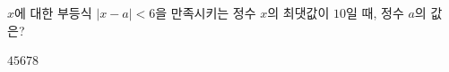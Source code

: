 $x$에 대한 부등식 $|x-a|<6$을 만족시키는 정수 $x$의 최댓값이 $10$일 때, 정수 $a$의 값은?
\begin{choices32}{$4$}{$5$}{$6$}{$7$}{$8$}\end{choices32}
